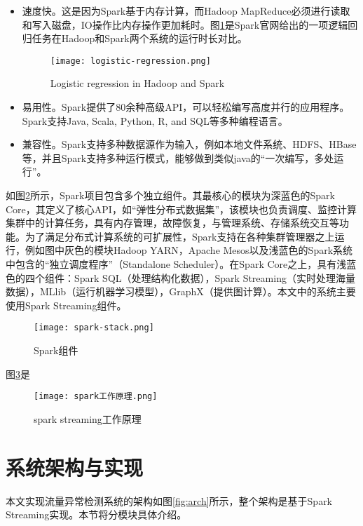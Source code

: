 \begin{itemize}
  \item 速度快。这是因为Spark基于内存计算，而Hadoop MapReduce必须进行读取和写入磁盘，IO操作比内存操作更加耗时。图\ref{fig:Logistic regression in Hadoop and Spark}是Spark官网给出的一项逻辑回归任务在Hadoop和Spark两个系统的运行时长对比。
   \begin{figure}
    \centering
    \texttt{[image: logistic-regression.png]}
    \caption{Logistic regression in Hadoop and Spark}
    \label{fig:Logistic regression in Hadoop and Spark}
  \end{figure}
  \item 易用性。Spark提供了80余种高级API，可以轻松编写高度并行的应用程序。Spark支持Java, Scala, Python, R, and SQL等多种编程语言。
  \item 兼容性。Spark支持多种数据源作为输入，例如本地文件系统、HDFS、HBase等，并且Spark支持多种运行模式，能够做到类似java的“一次编写，多处运行”。
\end{itemize}



如图\ref{fig:Spark组件}所示，Spark项目包含多个独立组件。其最核心的模块为深蓝色的Spark Core，其定义了核心API，如“弹性分布式数据集”，该模块也负责调度、监控计算集群中的计算任务，具有内存管理，故障恢复，与管理系统、存储系统交互等功能。为了满足分布式计算系统的可扩展性，Spark支持在各种集群管理器之上运行，例如图中灰色的模块Hadoop YARN，Apache Mesos以及浅蓝色的Spark系统中包含的“独立调度程序”（Standalone Scheduler）。在Spark Core之上，具有浅蓝色的四个组件：Spark SQL（处理结构化数据），Spark Streaming（实时处理海量数据），MLlib（运行机器学习模型），GraphX（提供图计算）。本文中的系统主要使用Spark Streaming组件。



\begin{figure}
  \centering
  \texttt{[image: spark-stack.png]}
  \caption{Spark组件}
  \label{fig:Spark组件}
\end{figure}

图\ref{fig:spark工作原理}是
\begin{figure}
  \centering
  \texttt{[image: spark工作原理.png]}
  \caption{spark streaming工作原理}
  \label{fig:spark工作原理}
\end{figure}

\section{系统架构与实现}
本文实现流量异常检测系统的架构如图\ref{fig:arch}所示，整个架构是基于Spark Streaming实现。本节将分模块具体介绍。
